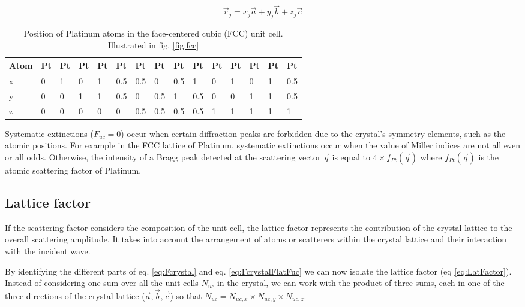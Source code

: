 \begin{equation}
    \label{eq:AtomPos}
    \vec{r}_j = x_j\vec{a} + y_j\vec{b} + z_j\vec{c}
\end{equation}

\begin{table}[!htb]
    \centering
    \begin{tabular}{@{}lllllllllllllll@{}}
    \toprule
    Atom & Pt & Pt & Pt & Pt & Pt  & Pt  & Pt  & Pt  & Pt  & Pt & Pt & Pt & Pt & Pt  \\ \midrule
    x    & 0  & 1  & 0  & 1  & 0.5 & 0.5 & 0   & 0.5 & 1   & 0  & 1  & 0  & 1  & 0.5 \\
    y    & 0  & 0  & 1  & 1  & 0.5 & 0   & 0.5 & 1   & 0.5 & 0  & 0  & 1  & 1  & 0.5 \\
    z    & 0  & 0  & 0  & 0  & 0   & 0.5 & 0.5 & 0.5 & 0.5 & 1  & 1  & 1  & 1  & 1   \\ \bottomrule
    \end{tabular}
    \label{tab:PtAtoms}
    \caption{Position of Platinum atoms in the face-centered cubic (FCC) unit cell. Illustrated in fig. \ref{fig:fcc}}
\end{table}

Systematic extinctions ($F_{uc} = 0$) occur when certain diffraction peaks are forbidden due to the crystal's symmetry elements, such as the atomic positions.
For example in the FCC lattice of Platinum, systematic extinctions occur when the value of Miller indices are not all even or all odds.
Otherwise, the intensity of a Bragg peak detected at the scattering vector $\vec{q}$ is equal to $4\times f_{Pt}(\vec{q})$ where $f_{Pt}(\vec{q})$ is the atomic scattering factor of Platinum.

\subsection{Lattice factor}

If the scattering factor considers the composition of the unit cell, the lattice factor represents the contribution of the crystal lattice to the overall scattering amplitude.
It takes into account the arrangement of atoms or scatterers within the crystal lattice and their interaction with the incident wave.

By identifying the different parts of eq. \ref{eq:Fcrystal} and eq. \ref{eq:FcrystalFlatFuc} we can now isolate the lattice factor (eq \ref{eq:LatFactor}).
Instead of considering one sum over all the unit cells $N_{uc}$ in the crystal, we can work with the product of three sums, each in one of the three directions of the crystal lattice ($\vec{a}, \vec{b}, \vec{c}$) so that $N_{uc} = N_{uc, x} \times N_{uc, y} \times N_{uc, z}$.

